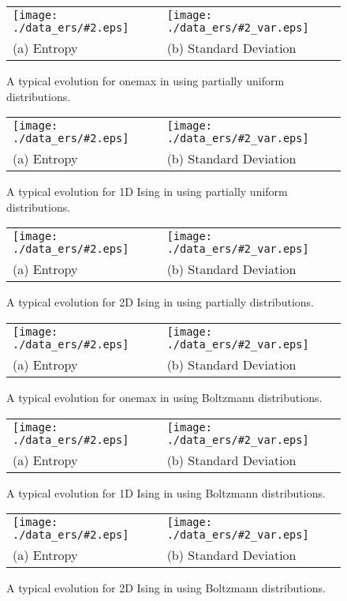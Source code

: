 \newcommand{\ersfigure}[2]{\begin{figure}[t]
\begin{center}
\begin{tabular}{p{\hfiglength\linewidth}p{\hfiglength\linewidth}}
\begin{minipage}{\linewidth}
\centerline{\texttt{[image: ./data\_ers/\#2.eps]}}
\end{minipage}
&
\begin{minipage}{\linewidth}
\centerline{\texttt{[image: ./data\_ers/\#2\_var.eps]}}
\end{minipage}
\\
\spcen
(a) Entropy
&
\spcen
(b) Standard Deviation
\\
\end{tabular}
\vskip -0.2in
\caption{#1}
\label{figers-#2}
\end{center}
\end{figure}
}

\ersfigure{A typical evolution for onemax in using partially uniform distributions.}{t_ers_0d}
\ersfigure{A typical evolution for 1D Ising in using partially uniform distributions.}{t_ers_1d}
\ersfigure{A typical evolution for 2D Ising in using partially  distributions.}{t_ers_2d}
\ersfigure{A typical evolution for onemax in using Boltzmann distributions.}{ers_0d}
\ersfigure{A typical evolution for 1D Ising in using Boltzmann distributions.}{ers_1d}
\ersfigure{A typical evolution for 2D Ising in using Boltzmann distributions.}{ers_2d}
